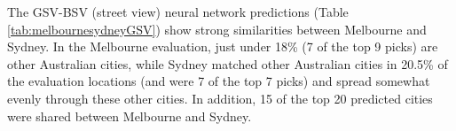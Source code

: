 \documentclass[Crown,sageh,times]{sagej}
\begin{document}
The GSV-BSV (street view) neural network predictions (Table \ref{tab:melbournesydneyGSV}) show strong similarities between Melbourne and Sydney. In the Melbourne evaluation, just under 18\% (7 of the top 9 picks) are other Australian cities, while Sydney matched other Australian cities in 20.5\% of the evaluation locations (and were 7 of the top 7 picks) and spread somewhat evenly through these other cities. In addition, 15 of the top 20 predicted cities were shared between Melbourne and Sydney.


\end{document}
